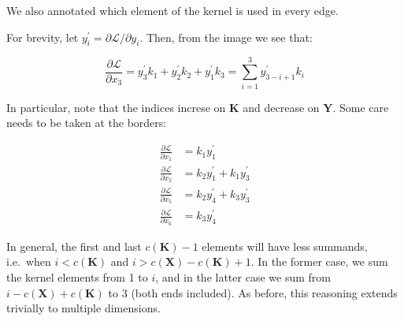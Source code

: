 \documentclass[
  a4paper,
]{article}
\begin{document}
We also annotated which element of the kernel is used in every edge.

For brevity, let \(y_i^\prime=\partial\mathcal{L}/\partial y_i\). Then,
from the image we see that:

\begin{equation}
\frac{\partial\mathcal{L}}{\partial x_3}=y_3^\prime k_1+y_2^\prime k_2+y_1^\prime k_3=\sum_{i=1}^3 y_{3-i+1}^\prime k_i
\end{equation}

In particular, note that the indices increse on \(\textbf{K}\) and
decrease on \(\textbf{Y}\). Some care needs to be taken at the borders:

\begin{align*}
\frac{\partial\mathcal{L}}{\partial x_1} &= k_1y_1^\prime \\
\frac{\partial\mathcal{L}}{\partial x_2} &= k_2y_1^\prime+k_1y_3^\prime \\
\frac{\partial\mathcal{L}}{\partial x_5} &= k_2y_4^\prime+k_3y_3^\prime \\
\frac{\partial\mathcal{L}}{\partial x_6} &= k_3y_4^\prime
\end{align*}

In general, the first and last \(c(\textbf{K})-1\) elements will have
less summands, i.e.~when \(i<c(\textbf{K})\) and
\(i>c(\textbf{X})-c(\textbf{K})+1\). In the former case, we sum the
kernel elements from 1 to \(i\), and in the latter case we sum from
\(i-c(\textbf{X})+c(\textbf{K})\) to 3 (both ends included). As before,
this reasoning extends trivially to multiple dimensions.
\end{document}
